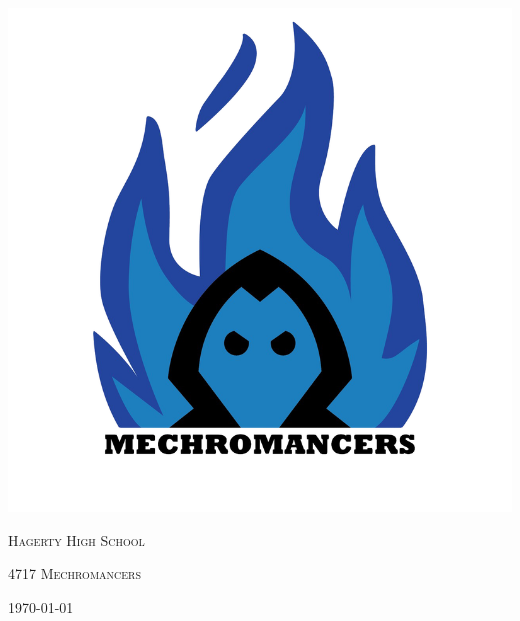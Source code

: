 \documentclass[
letterpaper, %
11pt, %
twoside,
onecolumn, %
openright, %
]{report}
\begin{document}
%
\makeatletter
\titleformat{\section}[runin]{}{}{0pt}{\@gobble}
\makeatother
\titlespacing{\section}{\parindent}{0pt}{0pt}

\pagestyle{hhsstyle}

\begin{titlepage}
    \centering
    \includegraphics[width= 1.0\textwidth]{Images/Main/4717newlogo.png}\par\vspace{1cm}
    {\scshape\LARGE Hagerty High School \par}
    \vspace{1cm}
    {\scshape\Large 4717 Mechromancers\par}
    \vfill
    {\large \today\par}
\end{titlepage}
\end{document}
